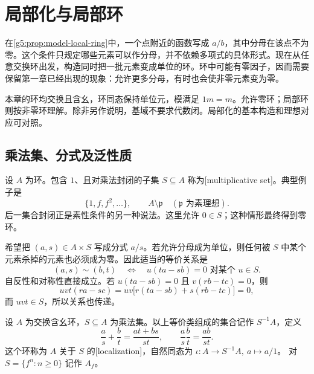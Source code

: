 
% 
% 

\section{局部化与局部环}
\label{g5:sec:0201}

在\cref{g5:prop:model-local-ring}中，一个点附近的函数写成 \(a/b\)，其中分母在该点不为零。这个条件只规定哪些元素可以作分母，并不依赖多项式的具体形式。现在从任意交换环出发，构造同时把一批元素变成单位的环。环中可能有零因子，因而需要保留第一章已经出现的现象：允许更多分母，有时也会使非零元素变为零。

\ProseParagraphBreak

本章的环均交换且含幺，环同态保持单位元，模满足 \(1m=m\)。允许零环；局部环则按非零环理解。除非另作说明，基域不要求代数闭。局部化的基本构造和理想对应可对照\cite[第4节，第20--24页]{Matsumura1989}。

\subsection{乘法集、分式及泛性质}
\label{g5:subsec:0201:01}

设 \(A\) 为环。包含 \(1\)、且对乘法封闭的子集 \(S\subseteq A\) 称为[multiplicative set]。典型例子是
\[
	\{1,f,f^2,\ldots\},\qquad A\setminus\mathfrak p
	\quad(\mathfrak p\text{ 为素理想}).
\]
后一集合封闭正是素性条件的另一种说法。这里允许 \(0\in S\)；这种情形最终得到零环。

\ProseParagraphBreak

希望把 \((a,s)\in A\times S\) 写成分式 \(a/s\)。若允许分母成为单位，则任何被 \(S\) 中某个元素杀掉的元素也必须成为零。因此适当的等价关系是
\[
	(a,s)\sim(b,t)
	\quad\Longleftrightarrow\quad
	u(ta-sb)=0\text{ 对某个 }u\in S.
\]
自反性和对称性直接成立。若 \(u(ta-sb)=0\) 且 \(v(rb-tc)=0\)，则
\[
	uvt(ra-sc)
	=uv\bigl[r(ta-sb)+s(rb-tc)\bigr]=0,
\]
而 \(uvt\in S\)，所以关系也传递。

\begin{definition}\label{g5:def:ring-localization}
	设 \(A\) 为交换含幺环，\(S\subseteq A\) 为乘法集。以上等价类组成的集合记作 \(S^{-1}A\)，定义
	\[
	\frac as+\frac bt=\frac{at+bs}{st},\qquad
	\frac as\frac bt=\frac{ab}{st}.
	\]
	这个环称为 \(A\) 关于 \(S\) 的[localization]，自然同态为 \(\iota:A\to S^{-1}A,\ a\mapsto a/1\)。 对 \(S=\{f^n:n\geq0\}\) 记作 \(A_f\)。
\end{definition}

